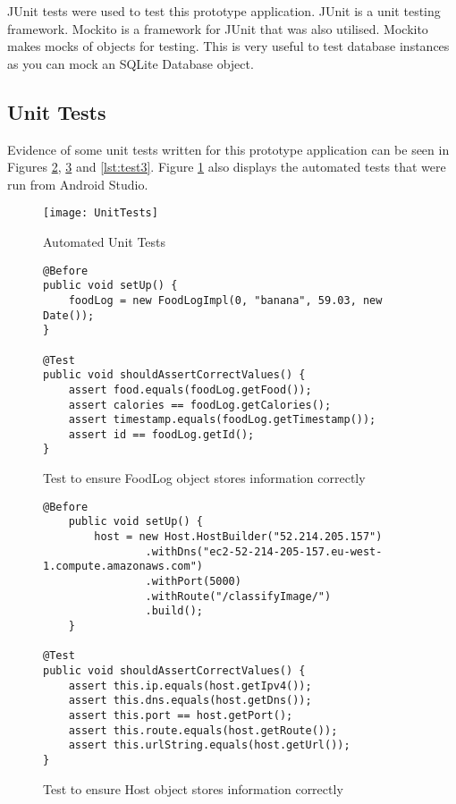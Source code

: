 JUnit tests were used to test this prototype application.
JUnit is a unit testing framework.
Mockito is a framework for JUnit that was also utilised.
Mockito makes mocks of objects for testing.
This is very useful to test database instances as you can mock an SQLite Database object.

\tocless\subsection{Unit Tests}
Evidence of some unit tests written for this prototype application can be seen in Figures \ref{lst:test1}, \ref{lst:test2} and \ref{lst:test3}.
Figure \ref{fig:unitTests} also displays the automated tests that were run from Android Studio.

\begin{figure}[h]
    \texttt{[image: UnitTests]}
    \caption{Automated Unit Tests}
    \label{fig:unitTests}
\end{figure}

\begin{figure}[h]
\caption{Test to ensure FoodLog object stores information correctly}
\label{lst:test1}
\begin{lstlisting}[style=Java]
@Before
public void setUp() {
    foodLog = new FoodLogImpl(0, "banana", 59.03, new Date());
}

@Test
public void shouldAssertCorrectValues() {
    assert food.equals(foodLog.getFood());
    assert calories == foodLog.getCalories();
    assert timestamp.equals(foodLog.getTimestamp());
    assert id == foodLog.getId();
}
\end{lstlisting}
\end{figure}

\begin{figure}[h]
\caption{Test to ensure Host object stores information correctly}
\label{lst:test2}
\begin{lstlisting}[style=Java]
@Before
    public void setUp() {
        host = new Host.HostBuilder("52.214.205.157")
                .withDns("ec2-52-214-205-157.eu-west-1.compute.amazonaws.com")
                .withPort(5000)
                .withRoute("/classifyImage/")
                .build();
    }

@Test
public void shouldAssertCorrectValues() {
    assert this.ip.equals(host.getIpv4());
    assert this.dns.equals(host.getDns());
    assert this.port == host.getPort();
    assert this.route.equals(host.getRoute());
    assert this.urlString.equals(host.getUrl());
}
\end{lstlisting}
\end{figure}

